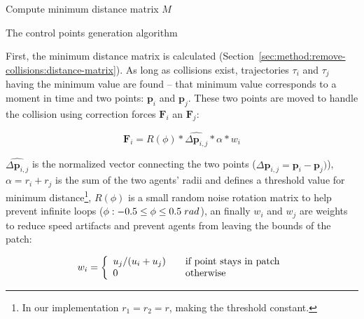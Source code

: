 \begin{algorithm}[t]
Compute minimum distance matrix $M$\;
\caption{The control points generation algorithm}
\label{algo:control-points}
\end{algorithm}





First, the minimum distance matrix is calculated (Section~\ref{sec:method:remove-collisions:distance-matrix}).
As long as collisions exist, trajectories $\tau_i$ and $\tau_j$ having the minimum value are found -- that minimum value corresponds to a moment in time and two points: $\mathbf{p}_i$ and $\mathbf{p}_j$.
These two points are moved to handle the collision using correction forces $\mathbf{F}_i$ an $\mathbf{F}_j$:

\begin{equation}
	 \mathbf{F}_{i}= R(\phi) * \hat{\Delta{\mathbf{p}_{i, j}}}* \alpha * w_i
\end{equation}

$\hat{\Delta{\mathbf{p}_{i, j}}}$ is the normalized vector connecting the two points ($\Delta{\mathbf{p}_{i, j}} = \mathbf{p}_i - \mathbf{p}_j)$),
$\alpha = r_i + r_j$ is the sum of the two agents' radii and defines a threshold value for minimum distance\footnote{In our implementation $r_1 = r_2 = r$, making the threshold constant.},
$R(\phi)$ is a small random noise rotation matrix to help prevent infinite loops ($\phi: -0.5 \le \phi \le 0.5 \hspace{0.1cm} rad$),
an finally $w_i$ and $w_j$ are weights to reduce speed artifacts and prevent agents from leaving the bounds of the patch:

\begin{equation}
w_i = \left\{
	\begin{array}{l l}
		u_j / (u_i + u_j)	&	\quad \text{if point stays in patch}\\
		0					&	\quad \text{otherwise}
	\end{array}
	\right.
\end{equation}

